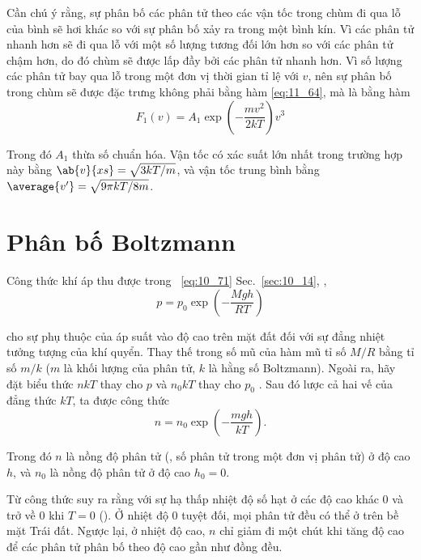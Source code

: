 Cần chú ý rằng, sự phân bố các phân tử theo các vận tốc trong chùm đi qua lỗ của bình sẽ hơi khác so với sự phân bố xảy ra trong một bình kín. Vì các phân tử nhanh hơn sẽ đi qua lỗ với một số lượng tương đối lớn hơn so với các phân tử chậm hơn, do đó chùm sẽ được lấp đầy bởi các phân tử nhanh hơn. Vì số lượng các phân tử bay qua lỗ trong một đơn vị thời gian tỉ lệ với $v$, nên sự phân bố trong chùm sẽ được đặc trưng không phải bằng hàm \eqref{eq:11_64}, mà là bằng hàm
\begin{equation*}
	F_1(v) = A_1 \exp\left(-\frac{mv^2}{2kT}\right) v^3
\end{equation*}

\noindent
Trong đó $A_1$ thừa số chuẩn hóa. Vận tốc có xác suất lớn nhất trong trường hợp này bằng $\ab{v}{xs}=\sqrt{3kT/m}$, và vận tốc trung bình bằng $\average{v'}=\sqrt{9\pi kT/8m}$.

\section{Phân bố Boltzmann}\label{sec:11_8}

Công thức khí áp thu được trong ~\eqref{eq:10_71} Sec.~\ref{sec:10_14}, \ie,
\begin{equation*}
	p = p_0 \exp\left(-\frac{Mgh}{RT}\right)
\end{equation*}

\noindent
cho sự phụ thuộc của áp suất vào độ cao trên mặt đất đối với sự đẳng nhiệt tưởng tượng của khí quyển. Thay thế trong số mũ của hàm mũ tỉ số $M/R$ bằng tỉ số $m/k$ ($m$ là khối lượng của phân tử, $k$ là hằng số Boltzmann). Ngoài ra, hãy đặt biểu thức $nkT$ thay cho $p$ và $n_0kT$ thay cho $p_0$ . Sau đó lược cả hai vế của đẳng thức $kT$, ta được công thức
\begin{equation}\label{eq:11_75}
	n = n_0 \exp\left(-\frac{mgh}{kT}\right).
\end{equation}

\noindent
Trong đó $n$ là nồng độ phân tử (\ie, số phân tử trong một đơn vị phân tử) ở độ cao $h$, và $n_0$ là nồng độ phân tử ở độ cao $h_0=0$.

Từ công thức  suy ra rằng với sự hạ thấp nhiệt độ số hạt ở các độ cao khác 0 và trở về 0 khi $T=0$ (). Ở nhiệt độ 0 tuyệt đối, mọi phân tử đều có thể ở trên bề mặt Trái đất. Ngược lại, ở nhiệt độ cao, $n$ chỉ giảm đi một chút khi tăng độ cao để các phân tử phân bố theo độ cao gần như đồng đều.

